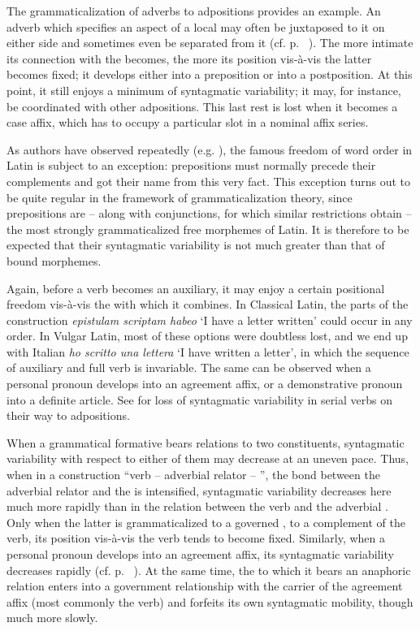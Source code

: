 The grammaticalization of adverbs to adpositions provides an example. An adverb which specifies an aspect of a local \np may often be juxtaposed to it on either side and sometimes even be separated from it (cf. p.~\pageref{page96}\chk%
). The more intimate its connection with the \np becomes, the more its position vis-à-vis the latter becomes fixed; it develops either into a preposition or into a postposition. At this point, it still enjoys a minimum of syntagmatic variability; it may, for instance, be coordinated with other adpositions. This last rest is lost when it becomes a case affix, which has to occupy a particular slot in a nominal affix series.

As authors have observed repeatedly (e.g. \citealt[256]{Matthews1981}), the famous freedom of word order in Latin is subject to an exception: prepositions must normally precede their complements and got their name from this very fact. This exception turns out to be quite regular in the framework of grammaticalization theory, since prepositions are -- along with conjunctions, for which similar restrictions obtain -- the most strongly grammaticalized free morphemes of Latin. It is therefore to be expected that their syntagmatic variability is not much greater than that of bound morphemes.

Again, before a verb becomes an auxiliary, it may enjoy a certain positional freedom vis-à-vis the \vp with which it combines. In Classical Latin, the parts of the construction \textit{epistulam scriptam habeo} ‘I have a letter written’ could occur in any order. In Vulgar Latin, most of these options were doubtless lost, and we end up with Italian \textit{ho scritto una lettera} ‘I have written a letter’, in which the sequence of auxiliary and full verb is invariable. The same can be observed when a personal pronoun develops into an agreement affix, or a demonstrative pronoun into a definite article. See \citet[84f]{Givón1975} for loss of syntagmatic variability in serial verbs on their way to adpositions.

When a grammatical formative bears relations to two constituents, syntagmatic variability with respect to either of them may decrease at an uneven pace. Thus, when in a construction ``verb -- adverbial relator -- \np'', the bond between the adverbial relator and the \np is intensified, syntagmatic variability decreases here much more rapidly than in the relation between the verb and the adverbial \np. Only when the latter is grammaticalized to a governed \np, to a complement of the verb, its position vis-à-vis the verb tends to become fixed. Similarly, when a personal pronoun develops into an agreement affix, its syntagmatic variability decreases rapidly (cf. p.~\pageref{page44b}\chk%
). At the same time, the \np to which it bears an anaphoric relation enters into a government relationship with the carrier of the agreement affix (most commonly the verb) and forfeits its own syntagmatic mobility, though much more slowly.


